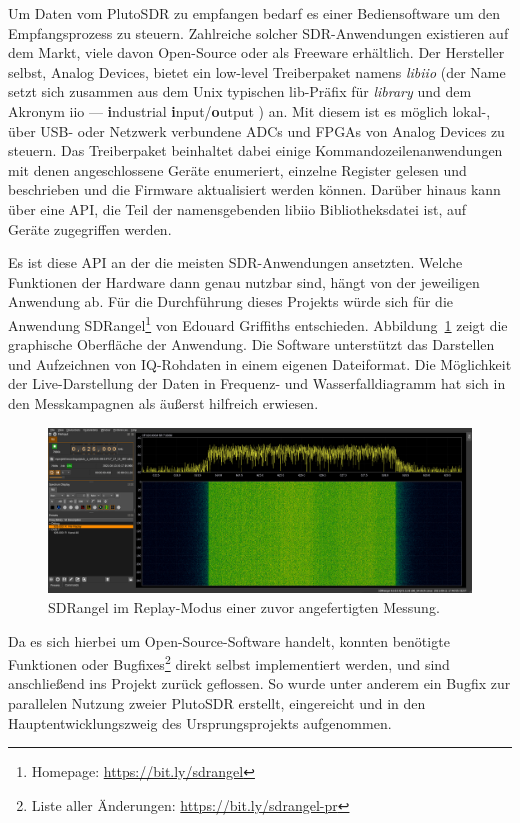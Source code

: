 Um Daten vom PlutoSDR zu empfangen bedarf es einer Bediensoftware um den Empfangsprozess zu steuern. Zahlreiche solcher SDR-Anwendungen existieren auf dem Markt, viele davon Open-Source oder als Freeware erhältlich. Der Hersteller selbst, Analog Devices, bietet ein low-level Treiberpaket namens \emph{libiio} (der Name setzt sich zusammen aus dem Unix typischen lib-Präfix für \emph{library} und dem Akronym iio --- %
\textbf{i}ndustrial \textbf{i}nput/\textbf{o}utput%
) an. Mit diesem ist es möglich lokal-, über USB- oder Netzwerk verbundene ADCs und FPGAs von Analog Devices zu steuern. Das Treiberpaket beinhaltet dabei einige Kommandozeilenanwendungen mit denen angeschlossene Geräte enumeriert, einzelne Register gelesen und beschrieben und die Firmware ak­tu­a­li­sie­rt werden können. Darüber hinaus kann über eine API, die Teil der namensgebenden libiio Bibliotheksdatei ist, auf Geräte zugegriffen werden.

Es ist diese API an der die meisten SDR-Anwendungen ansetzten. Welche Funktionen der Hardware dann genau nutzbar sind, hängt von der jeweiligen Anwendung ab. Für die Durchführung dieses Projekts würde sich für die Anwendung SDRangel\footnote{Homepage: \url{https://bit.ly/sdrangel}} von Edouard Griffiths entschieden. Abbildung~\ref{fig:sdrangel_screenshot} zeigt die graphische Oberfläche der Anwendung. Die Software unterstützt das Darstellen und Aufzeichnen von IQ-Rohdaten in einem eigenen Dateiformat. Die Möglichkeit der Live-Darstellung der Daten in Frequenz- und Wasserfalldiagramm hat sich in den Messkampagnen als äußerst hilfreich erwiesen.

\begin{figure}[htb]
    \centering
    \includegraphics[width=\textwidth]{images/sdrangel.png}
    \caption{SDRangel im Replay-Modus einer zuvor angefertigten Messung.}\label{fig:sdrangel_screenshot}
\end{figure}

Da es sich hierbei um Open-Source-Software handelt, konnten benötigte Funktionen oder Bugfixes\footnote{Liste aller Änderungen: \url{https://bit.ly/sdrangel-pr}} direkt selbst implementiert werden, und sind anschließend ins Projekt zurück geflossen. So wurde unter anderem ein Bugfix zur parallelen Nutzung zweier PlutoSDR erstellt, eingereicht und in den Hauptentwicklungszweig des Ursprungsprojekts aufgenommen.

